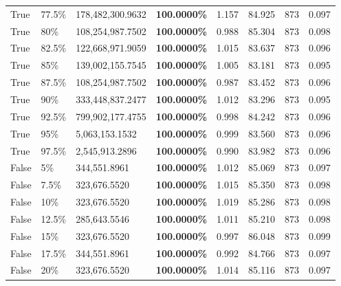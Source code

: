 \begin{table}[H]
{\begin{tabular}{lllrllll}
\cline{1-8} \cline{2-8}
True & 77.5\% & 178,482,300.9632 & \bfseries \color{red} 100.0000\% & 1.157 & 84.925 & 873 & 0.097 \\
\cline{1-8} \cline{2-8}
True & 80\% & 108,254,987.7502 & \bfseries \color{red} 100.0000\% & 0.988 & 85.304 & 873 & 0.098 \\
\cline{1-8} \cline{2-8}
True & 82.5\% & 122,668,971.9059 & \bfseries \color{red} 100.0000\% & 1.015 & 83.637 & 873 & 0.096 \\
\cline{1-8} \cline{2-8}
True & 85\% & 139,002,155.7545 & \bfseries \color{red} 100.0000\% & 1.005 & 83.181 & 873 & 0.095 \\
\cline{1-8} \cline{2-8}
True & 87.5\% & 108,254,987.7502 & \bfseries \color{red} 100.0000\% & 0.987 & 83.452 & 873 & 0.096 \\
\cline{1-8} \cline{2-8}
True & 90\% & 333,448,837.2477 & \bfseries \color{red} 100.0000\% & 1.012 & 83.296 & 873 & 0.095 \\
\cline{1-8} \cline{2-8}
True & 92.5\% & 799,902,177.4755 & \bfseries \color{red} 100.0000\% & 0.998 & 84.242 & 873 & 0.096 \\
\cline{1-8} \cline{2-8}
True & 95\% & 5,063,153.1532 & \bfseries \color{red} 100.0000\% & 0.999 & 83.560 & 873 & 0.096 \\
\cline{1-8} \cline{2-8}
True & 97.5\% & 2,545,913.2896 & \bfseries \color{red} 100.0000\% & 0.990 & 83.982 & 873 & 0.096 \\
\cline{1-8} \cline{2-8}
False & 5\% & 344,551.8961 & \bfseries \color{red} 100.0000\% & 1.012 & 85.069 & 873 & 0.097 \\
\cline{1-8} \cline{2-8}
False & 7.5\% & 323,676.5520 & \bfseries \color{red} 100.0000\% & 1.015 & 85.350 & 873 & 0.098 \\
\cline{1-8} \cline{2-8}
False & 10\% & 323,676.5520 & \bfseries \color{red} 100.0000\% & 1.019 & 85.286 & 873 & 0.098 \\
\cline{1-8} \cline{2-8}
False & 12.5\% & 285,643.5546 & \bfseries \color{red} 100.0000\% & 1.011 & 85.210 & 873 & 0.098 \\
\cline{1-8} \cline{2-8}
False & 15\% & 323,676.5520 & \bfseries \color{red} 100.0000\% & 0.997 & 86.048 & 873 & 0.099 \\
\cline{1-8} \cline{2-8}
False & 17.5\% & 344,551.8961 & \bfseries \color{red} 100.0000\% & 0.992 & 84.766 & 873 & 0.097 \\
\cline{1-8} \cline{2-8}
False & 20\% & 323,676.5520 & \bfseries \color{red} 100.0000\% & 1.014 & 85.116 & 873 & 0.097 \\

\end{tabular}}
\end{table}

